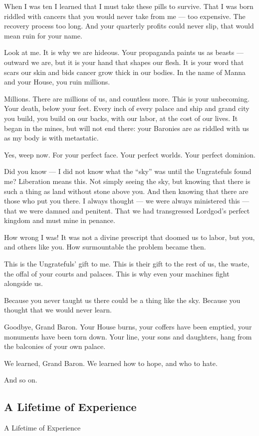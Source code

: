When I was ten I learned that I must take these pills to survive. That I was born riddled with
cancers that you would never take from me — too expensive. The recovery process too long. And
your quarterly profits could never slip, that would mean ruin for your name.

Look at me. It is why we are hideous. Your propaganda paints us as beasts — outward we are,
but it is your hand that shapes our flesh. It is your word that scars our skin and bids cancer grow
thick in our bodies. In the name of Manna and your House, you ruin millions.

Millions. There are millions of us, and countless more. This is your unbecoming. Your death,
below your feet. Every inch of every palace and ship and grand city you build, you build on our
backs, with our labor, at the cost of our lives. It began in the mines, but will not end there: your
Baronies are as riddled with us as my body is with metastatic.




Yes, weep now. For your perfect face. Your perfect worlds. Your perfect dominion.

Did you know — I did not know what the “sky” was until the Ungratefuls found me? Liberation
means this. Not simply seeing the sky, but knowing that there is such a thing as land without
stone above you. And then knowing that there are those who put you there. I always thought —
we were always ministered this — that we were damned and penitent. That we had transgressed
Lordgod’s perfect kingdom and must mine in penance.

How wrong I was! It was not a divine prescript that doomed us to labor, but you, and others like
you. How surmountable the problem became then.

This is the Ungratefuls’ gift to me. This is their gift to the rest of us, the waste, the offal of your
courts and palaces. This is why even your machines fight alongside us.

Because you never taught us there could be a thing like the sky. Because you thought that we
would never learn.

Goodbye, Grand Baron. Your House burns, your coffers have been emptied, your monuments
have been torn down. Your line, your sons and daughters, hang from the balconies of your own
palace.

We learned, Grand Baron. We learned how to hope, and who to hate.

And so on.

\subsection{A Lifetime of Experience}
A Lifetime of Experience

